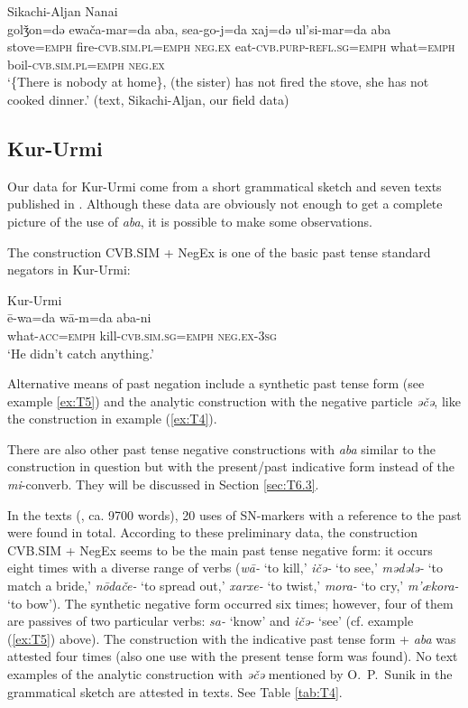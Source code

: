 \documentclass[output=paper]{langscibook}
\begin{document}
\ea Sikachi-Aljan Nanai \label{ex:T13}\\
	\gll golǯon=də	ewača-mar=da	aba, sea-go-j=da	xaj=də	ul’si-mar=da	aba\\
	stove=\textsc{emph}	fire-\textsc{cvb.sim.pl=emph}	\textsc{neg.ex} eat-\textsc{cvb.purp-refl.sg=emph}	what=\textsc{emph}	boil-\textsc{cvb.sim.pl=emph}	\textsc{neg.ex}\\
	\glt `\{There is nobody at home\}, (the sister) has not fired the stove, she has not cooked dinner.' (text, Sikachi-Aljan, our field data)
\z

\subsection{Kur-Urmi}\label{sec:T5.3}

Our data for Kur-Urmi come from a short grammatical sketch and seven texts published in \citet{sunik1958a}. Although these data are obviously not enough to get a complete picture of the use of \textit{aba}, it is possible to make some observations.

The construction CVB.SIM + NegEx is one of the basic past tense standard negators in Kur-Urmi:

\ea Kur-Urmi \label{ex:T14}\\
	\gll ē-wa=da	wā-m=da	aba-ni\\
	what-\textsc{acc=emph}	kill-\textsc{cvb.sim.sg=emph}	\textsc{neg.ex-3sg}\\
	\glt `He didn’t catch anything.' \citep[134, text]{sunik1958a}
\z

Alternative means of past negation include a synthetic past tense form (see example \ref{ex:T5}) and the analytic construction with the negative particle \textit{əčə}, like the construction in example (\ref{ex:T4}).

There are also other past tense negative constructions with \textit{aba} similar to the construction in question but with the present/past indicative form instead of the \textit{mi}-converb. They will be discussed in Section \ref{sec:T6.3}.

In the texts (\citealp{sunik1958a}, ca. 9700 words), 20 uses of SN-markers with a reference to the past were found in total. According to these preliminary data, the construction CVB.SIM + NegEx seems to be the main past tense negative form: it occurs eight times with a diverse range of verbs (\textit{wā-} ‘to kill,’ \textit{ičə-} ‘to see,’ \textit{mədələ-} ‘to match a bride,’ \textit{nōdače-} ‘to spread out,’ \textit{xarxe-} ‘to twist,’ \textit{mora-} ‘to cry,’ \textit{m’ækora-} ‘to bow’). The synthetic negative form occurred six times; however, four of them are passives of two particular verbs: \textit{sa-} ‘know’ and \textit{ičə-} ‘see’ (cf. example (\ref{ex:T5}) above). The construction with the indicative past tense form + \textit{aba} was attested four times (also one use with the present tense form was found). No text examples of the analytic construction with \textit{əčə} mentioned by O. P. Sunik in the grammatical sketch are attested in texts. See Table \ref{tab:T4}.
\end{document}
